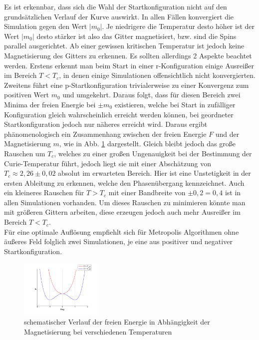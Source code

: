 Es ist erkennbar, dass sich die Wahl der Startkonfiguration nicht auf den grundsätzlichen Verlauf der Kurve auswirkt. In allen Fällen konvergiert die Simulation gegen den Wert $|m_0|$. Je niedrigere die Temperatur desto höher ist der Wert $|m_0|$ desto stärker ist also das Gitter magnetisiert, bzw. sind die Spins parallel ausgerichtet. Ab einer gewissen kritischen Temperatur ist jedoch keine Magnetisierung des Gitters zu erkennen. Es sollten allerdings 2 Aspekte beachtet werden. Erstens erkennt man beim Start in einer r-Konfiguration einige Ausreißer im Bereich $T<T_{c}$, in denen einige Simulationen offensichtlich nicht konvergierten. Zweitens führt eine p-Startkonfiguration trivialerweise zu einer Konvergenz zum positiven Wert $m_{0}$ und umgekehrt. Daraus folgt, dass für diesen Bereich zwei Minima der freien Energie bei $\pm m_{0}$ existieren, welche bei Start in zufälliger Konfiguration gleich wahrscheinlich erreicht werden können, bei geordneter Startkonfiguration jedoch nur näheres erreicht wird. Daraus ergibt phänomenologisch ein Zusammenhang zwischen der freien Energie $F$ und der Magnetisierung $m$, wie in Abb. \ref{fmagT} dargestellt. Gleich bleibt jedoch das große Rauschen um $T_{c}$, welches zu einer großen Ungenauigkeit bei der Bestimmung der Curie-Temperatur führt, jedoch liegt sie mit einer Abschätzung von $T_{c}\approx 2,26\pm 0,02$ absolut im erwarteten Bereich. Hier ist eine Unstetigkeit in der ersten Ableitung zu erkennen, welche den Phasenübergang kennzeichnet. Auch ein kleineres Rauschen für $T>T_{c}$ mit einer Bandbreite von $\pm 0,2 = 0,4$ ist in allen Simulationen vorhanden. Um dieses Rauschen zu minimieren könnte man mit größeren Gittern arbeiten, diese erzeugen jedoch auch mehr Ausreißer im Bereich $T<T_{c}$.\\
Für eine optimale Auflösung empfiehlt sich für Metropolis Algorithmen ohne äußeres Feld folglich zwei Simulationen, je eine aus positiver und negativer Startkonfiguration.
\begin{figure}[H]
	\centering
	\includegraphics[width=0.35\textwidth]{../Graph_Export/F(mag)_T.jpg}
	\caption{schematischer Verlauf der freien Energie in Abhängigkeit der Magnetisierung bei verschiedenen Temperaturen}
	\label{fmagT}
\end{figure}
